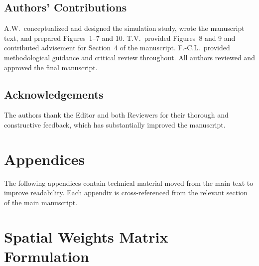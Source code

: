 \documentclass{article}[11pt]
\begin{document}
\subsection*{Authors' Contributions}
A.W.\ conceptualized and designed the simulation study, wrote the manuscript text, and prepared Figures~1--7 and 10. T.V.\ provided Figures~8 and 9 and contributed advisement for Section~4 of the manuscript. F.-C.L.\ provided methodological guidance and critical review throughout. All authors reviewed and approved the final manuscript.

\subsection*{Acknowledgements}
The authors thank the Editor and both Reviewers for their thorough and constructive feedback, which has substantially improved the manuscript.





\clearpage
\appendix
\renewcommand{\thesection}{\Alph{section}}

\section*{Appendices}
\vspace{0.5em}
\noindent The following appendices contain technical material moved from the main text to improve readability. Each appendix is cross-referenced from the relevant section of the main manuscript.
\vspace{1em}

\section{Spatial Weights Matrix Formulation}\label{appendix:SpatialWeights}
\end{document}
